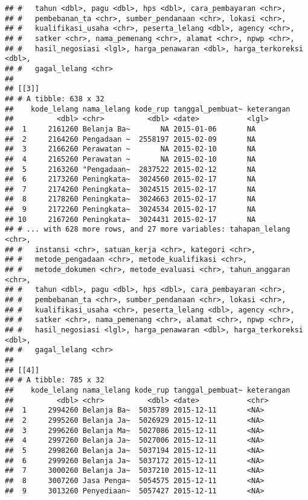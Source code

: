 \documentclass[]{article}
\begin{document}
\begin{verbatim}
## #   tahun <dbl>, pagu <dbl>, hps <dbl>, cara_pembayaran <chr>,
## #   pembebanan_ta <chr>, sumber_pendanaan <chr>, lokasi <chr>,
## #   kualifikasi_usaha <chr>, peserta_lelang <dbl>, agency <chr>,
## #   satker <chr>, nama_pemenang <chr>, alamat <chr>, npwp <chr>,
## #   hasil_negosiasi <lgl>, harga_penawaran <dbl>, harga_terkoreksi <dbl>,
## #   gagal_lelang <chr>
## 
## [[3]]
## # A tibble: 638 x 32
##    kode_lelang nama_lelang kode_rup tanggal_pembuat~ keterangan
##          <dbl> <chr>          <dbl> <date>           <lgl>     
##  1     2161260 Belanja Ba~       NA 2015-01-06       NA        
##  2     2164260 Pengadaan ~  2558197 2015-02-09       NA        
##  3     2166260 Perawatan ~       NA 2015-02-10       NA        
##  4     2165260 Perawatan ~       NA 2015-02-10       NA        
##  5     2163260 "Pengadaan~  2837522 2015-02-12       NA        
##  6     2173260 Peningkata~  3024560 2015-02-17       NA        
##  7     2174260 Peningkata~  3024515 2015-02-17       NA        
##  8     2178260 Peningkata~  3024663 2015-02-17       NA        
##  9     2172260 Peningkata~  3024534 2015-02-17       NA        
## 10     2167260 Peningkata~  3024431 2015-02-17       NA        
## # ... with 628 more rows, and 27 more variables: tahapan_lelang <chr>,
## #   instansi <chr>, satuan_kerja <chr>, kategori <chr>,
## #   metode_pengadaan <chr>, metode_kualifikasi <chr>,
## #   metode_dokumen <chr>, metode_evaluasi <chr>, tahun_anggaran <chr>,
## #   tahun <dbl>, pagu <dbl>, hps <dbl>, cara_pembayaran <chr>,
## #   pembebanan_ta <chr>, sumber_pendanaan <chr>, lokasi <chr>,
## #   kualifikasi_usaha <chr>, peserta_lelang <dbl>, agency <chr>,
## #   satker <chr>, nama_pemenang <chr>, alamat <chr>, npwp <chr>,
## #   hasil_negosiasi <lgl>, harga_penawaran <dbl>, harga_terkoreksi <dbl>,
## #   gagal_lelang <chr>
## 
## [[4]]
## # A tibble: 785 x 32
##    kode_lelang nama_lelang kode_rup tanggal_pembuat~ keterangan
##          <dbl> <chr>          <dbl> <date>           <chr>     
##  1     2994260 Belanja Ba~  5035789 2015-12-11       <NA>      
##  2     2995260 Belanja Ja~  5026929 2015-12-11       <NA>      
##  3     2996260 Belanja Ma~  5027086 2015-12-11       <NA>      
##  4     2997260 Belanja Ja~  5027006 2015-12-11       <NA>      
##  5     2998260 Belanja Ja~  5037194 2015-12-11       <NA>      
##  6     2999260 Belanja Ja~  5037172 2015-12-11       <NA>      
##  7     3000260 Belanja Ja~  5037210 2015-12-11       <NA>      
##  8     3007260 Jasa Penga~  5054575 2015-12-11       <NA>      
##  9     3013260 Penyediaan~  5057427 2015-12-11       <NA>      

\end{verbatim}
\end{document}
